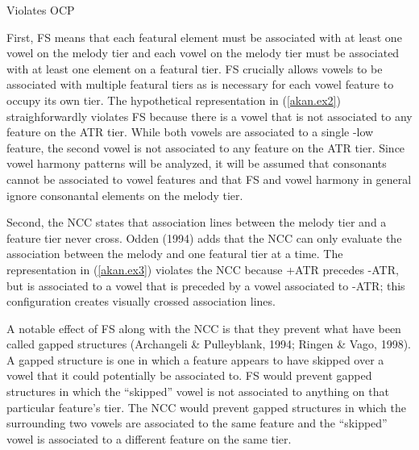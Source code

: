 \documentclass[floatsintext,man]{apa6}
\theoremstyle{definition}
\theoremstyle{definition}
\theoremstyle{definition}
\theoremstyle{remark}
\begin{document}
\begin{exe}
\ex \label{akan.ex4} Violates OCP
\end{exe}

First, FS means that each featural element must be associated with at
least one vowel on the melody tier and each vowel on the melody tier
must be associated with at least one element on a featural tier. FS
crucially allows vowels to be associated with multiple featural tiers as
is necessary for each vowel feature to occupy its own tier. The
hypothetical representation in (\ref{akan.ex2}) straighforwardly
violates FS because there is a vowel that is not associated to any
feature on the ATR tier. While both vowels are associated to a single
-low feature, the second vowel is not associated to any feature on the
ATR tier. Since vowel harmony patterns will be analyzed, it will be
assumed that consonants cannot be associated to vowel features and that
FS and vowel harmony in general ignore consonantal elements on the
melody tier.

Second, the NCC states that association lines between the melody tier
and a feature tier never cross. Odden (1994) adds that the NCC can only
evaluate the association between the melody and one featural tier at a
time. The representation in (\ref{akan.ex3}) violates the NCC because
+ATR precedes -ATR, but is associated to a vowel that is preceded by a
vowel associated to -ATR; this configuration creates visually crossed
association lines.

A notable effect of FS along with the NCC is that they prevent what have
been called gapped structures (Archangeli \& Pulleyblank, 1994; Ringen
\& Vago, 1998). A gapped structure is one in which a feature appears to
have skipped over a vowel that it could potentially be associated to. FS
would prevent gapped structures in which the \enquote{skipped} vowel is
not associated to anything on that particular feature's tier. The NCC
would prevent gapped structures in which the surrounding two vowels are
associated to the same feature and the \enquote{skipped} vowel is
associated to a different feature on the same tier.
\end{document}
